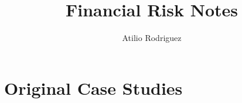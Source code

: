 \documentclass[11pt]{book}
\title{Financial Risk Notes}
\author{Atilio Rodriguez}
\begin{document}
\maketitle
\tableofcontents







\appendix

\chapter{Original Case Studies}


\end{document}
